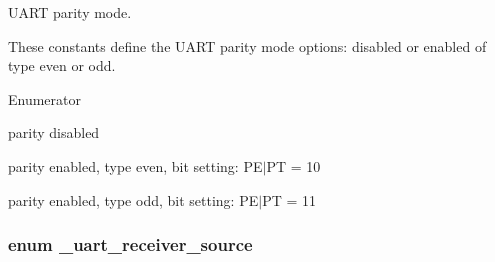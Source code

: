 U\+A\+RT parity mode. 

These constants define the U\+A\+RT parity mode options\+: disabled or enabled of type even or odd. \begin{Desc}
\item[Enumerator]\par
\begin{description}
\item[{\em 
k\+Uart\+Parity\+Disabled\hypertarget{group__uart__hal_ggadf9f66755acc340eab030e1a48e35e10aaa442d2224e06b4118463ed49f3768d6}{}\label{group__uart__hal_ggadf9f66755acc340eab030e1a48e35e10aaa442d2224e06b4118463ed49f3768d6}
}]parity disabled \item[{\em 
k\+Uart\+Parity\+Even\hypertarget{group__uart__hal_ggadf9f66755acc340eab030e1a48e35e10a3f5ca507d31e770da03b9ca473b41469}{}\label{group__uart__hal_ggadf9f66755acc340eab030e1a48e35e10a3f5ca507d31e770da03b9ca473b41469}
}]parity enabled, type even, bit setting\+: P\+E$\vert$\+PT = 10 \item[{\em 
k\+Uart\+Parity\+Odd\hypertarget{group__uart__hal_ggadf9f66755acc340eab030e1a48e35e10adc98b9d68156ba24739da03a52a0631f}{}\label{group__uart__hal_ggadf9f66755acc340eab030e1a48e35e10adc98b9d68156ba24739da03a52a0631f}
}]parity enabled, type odd, bit setting\+: P\+E$\vert$\+PT = 11 \end{description}
\end{Desc}
\subsubsection[{\texorpdfstring{\+\_\+uart\+\_\+receiver\+\_\+source}{_uart_receiver_source}}]{\setlength{\rightskip}{0pt plus 5cm}enum {\bf \+\_\+uart\+\_\+receiver\+\_\+source}}\hypertarget{group__uart__hal_gae84554e8367780b93162f4c3a3c46082}{}\label{group__uart__hal_gae84554e8367780b93162f4c3a3c46082}


